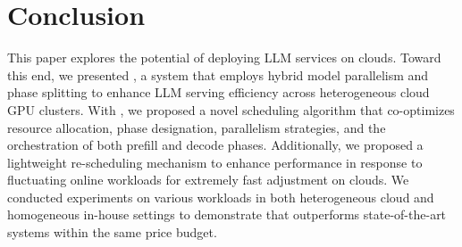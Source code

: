 \section{Conclusion}
\label{sec:con}
This paper explores the potential of deploying LLM services on clouds. Toward this end, we presented \sys, a system that employs hybrid model parallelism and phase splitting to enhance LLM serving efficiency across heterogeneous cloud GPU clusters.
With \sys, we proposed a novel scheduling algorithm that co-optimizes resource allocation, phase designation, parallelism strategies, and the orchestration of both prefill and decode phases. 
Additionally, we proposed a lightweight re-scheduling mechanism to enhance \sys performance in response to fluctuating online workloads for extremely fast adjustment on clouds. 
We conducted experiments on various workloads in both heterogeneous cloud and homogeneous in-house settings to demonstrate that \sys 
outperforms state-of-the-art systems within the same price budget.